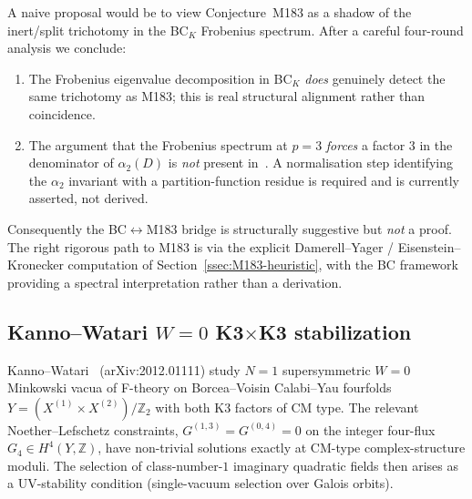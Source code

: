 \documentclass[12pt]{amsart}
\theoremstyle{definition}
\newcommand{\Z}{\mathbb{Z}}
\begin{document}
A naive proposal would be to view Conjecture~M183 as a shadow of the
inert/split trichotomy in the BC$_K$ Frobenius spectrum. After a
careful four-round analysis we conclude:
\begin{enumerate}[leftmargin=2em]
  \item The Frobenius eigenvalue decomposition in BC$_K$ \emph{does}
        genuinely detect the same trichotomy as M183; this is real
        structural alignment rather than coincidence.
  \item The argument that the Frobenius spectrum at $p = 3$
        \emph{forces} a factor $3$ in the denominator of $\alpha_2(D)$
        is \emph{not} present in~\cite{ConnesMarcolliRamachandran2005}.
        A normalisation step
        identifying the $\alpha_2$ invariant with a partition-function
        residue is required and is currently asserted, not derived.
\end{enumerate}
Consequently the BC$\leftrightarrow$M183 bridge is structurally suggestive but
\emph{not} a proof. The right rigorous path to M183 is via the explicit
Damerell--Yager / Eisenstein--Kronecker computation of
Section~\ref{ssec:M183-heuristic}, with the BC framework providing a
spectral interpretation rather than a derivation.

\subsection{Kanno--Watari $W = 0$ K3$\times$K3 stabilization}

Kanno--Watari~\cite{KannoWatari2020} (arXiv:2012.01111) study
$N = 1$ supersymmetric $W = 0$ Minkowski vacua of F-theory on
Borcea--Voisin Calabi--Yau fourfolds $Y = (X^{(1)} \times X^{(2)})/\Z_2$
with both K3 factors of CM type. The relevant Noether--Lefschetz
constraints, $G^{(1,3)} = G^{(0,4)} = 0$ on the integer four-flux
$G_4 \in H^4(Y, \Z)$, have non-trivial solutions exactly at
CM-type complex-structure moduli. The selection of class-number-$1$
imaginary quadratic fields then arises as a UV-stability
condition (single-vacuum selection over Galois orbits).
\end{document}
